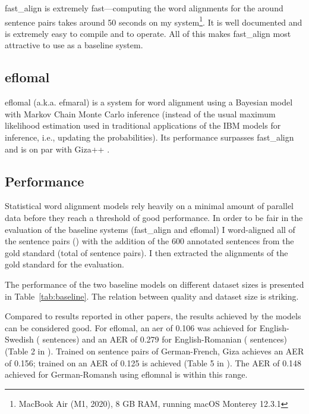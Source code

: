fast\_align is extremely fast---computing the word alignments for the around  sentence pairs takes around 50 seconds on my system\footnote{MacBook Air (M1, 2020), 8 GB RAM, running macOS Monterey 12.3.1}. 
It is well documented and is extremely easy to compile and to operate. 
All of this makes fast\_align most attractive to use as a baseline system.

\subsection{eflomal}
eflomal (a.k.a. efmaral\footnotemark) is a system for word alignment using a Bayesian model with Markov Chain Monte Carlo inference (instead of the usual maximum likelihood estimation used in traditional applications of the IBM models for inference, i.e., updating the probabilities). 
Its performance surpasses fast\_align and is on par with Giza++ \autocite{Ostling2016efmaral}.



\subsection{Performance}
Statistical word alignment models rely heavily  on a minimal amount of parallel data before they reach a threshold of good performance. In order to be fair in the evaluation of the baseline systems (fast\_align and eflomal) I word-aligned all of the sentence pairs () with  the addition of the 600 annotated sentences from the gold standard (total of  sentence pairs). I then extracted the alignments of the gold standard for the evaluation.
 

The performance of the two baseline models on different dataset sizes is presented in Table~\ref{tab:baseline}. The relation between quality and dataset size is striking. 

Compared to  results reported in other papers, the results achieved by the models can be considered good. 
For eflomal,  an \acrshort{aer} of 0.106  was achieved for English-Swedish ( sentences) and an AER of 0.279 for English-Romanian ( sentences) (Table 2 in \textcite{Ostling2016efmaral}). 
Trained on  sentence pairs of German-French, Giza achieves an AER of 0.156; trained on  an AER of 0.125 is achieved (Table 5 in \textcite{och-ney-2000-improved}). 
The AER of 0.148 achieved for German-Romansh using eflomnal is within this range.



